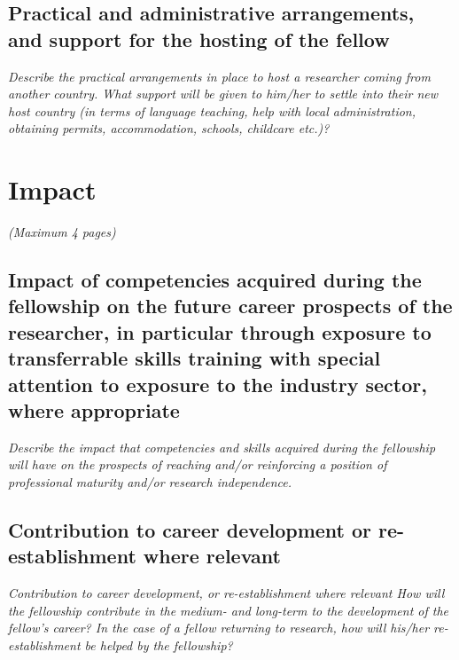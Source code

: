 \documentclass[a4paper,11pt]{article}
\newenvironment{xcomment}{\em}{}
\begin{document}
\subsection{Practical and administrative arrangements, and support for the hosting of the fellow  }
\begin{xcomment}
 Describe the practical arrangements in place to host a researcher coming from another country.
What support will be given to him/her to settle into their new host country (in terms of language
teaching, help with local administration, obtaining permits, accommodation, schools, childcare
etc.)?
\end{xcomment}



\newpage
\section{Impact}
\begin{xcomment}  
(Maximum 4 pages)
\end{xcomment}
\subsection{Impact of competencies acquired during the fellowship on the future career prospects of the researcher, in particular through exposure to transferrable skills training with special attention to exposure to the industry sector, where appropriate}
\begin{xcomment}
 Describe the impact that competencies and skills acquired during the fellowship will have on the
prospects of reaching and/or reinforcing a position of professional maturity and/or research
independence.
\end{xcomment}

\subsection{Contribution to career development or re-establishment where relevant}
\begin{xcomment}
 Contribution to career development, or re-establishment where relevant
How will the fellowship contribute in the medium- and long-term to the development of the
fellow’s career? In the case of a fellow returning to research, how will his/her re-establishment be
helped by the fellowship?
\end{xcomment}
\end{document}
